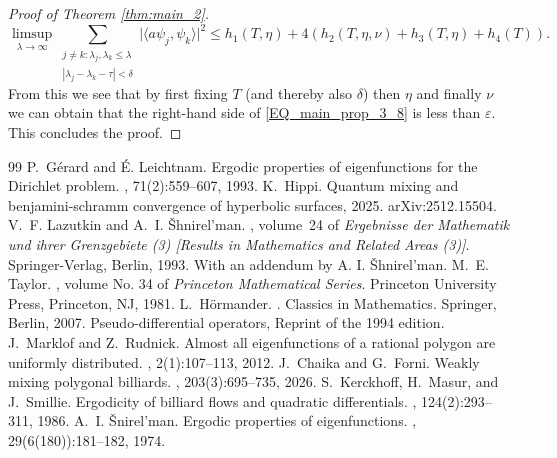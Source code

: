 \documentclass[10pt,a4paper]{amsart}
\newcommand{\1}{\mathrm{\mathbf{1}}}
\numberwithin{equation}{section}
\begin{document}
\begin{proof}[Proof of Theorem \ref{thm:main_2}]
\begin{equation}\label{EQ_main_prop_3_8}
    \limsup_{\lambda\rightarrow\infty}  \sum_{\substack{j\neq k: \lambda_j,\lambda_k\leq \lambda  \\ |\lambda_{j}-\lambda_{k}-\tau| < \delta}} \big| \langle a \psi_j , \psi_k\rangle  \big|^2 
    \leq h_1(T,\eta) + 4( h_{2}(T,\eta,\nu) +  h_3(T,\eta) +  h_4(T)).
\end{equation}
From this we see that by first fixing $T$ (and thereby also $\delta$) then $\eta$ and finally $\nu$ we can obtain that the right-hand side of \eqref{EQ_main_prop_3_8} is less than $\varepsilon$. This concludes the proof.
\end{proof}


\begin{thebibliography}{99}
 P.~G\'erard and \'E. Leichtnam. \newblock Ergodic properties of eigenfunctions for the {D}irichlet problem. , 71(2):559--607, 1993.
 K.~Hippi. \newblock Quantum mixing and benjamini-schramm convergence of hyperbolic surfaces, 2025. \newblock arXiv:2512.15504.
 V.~F. Lazutkin and A.~I. {\v{S}}hnirel'man. , volume~24 of {\em Ergebnisse der Mathematik und ihrer Grenzgebiete (3) [Results in Mathematics and Related Areas (3)]}. \newblock Springer-Verlag, Berlin, 1993. \newblock With an addendum by A. I. {\v{S}}hnirel'man.
 M.~E. Taylor. , volume No. 34 of {\em Princeton Mathematical Series}. \newblock Princeton University Press, Princeton, NJ, 1981.
 L.~H\"ormander. . \newblock Classics in Mathematics. Springer, Berlin, 2007. \newblock Pseudo-differential operators, Reprint of the 1994 edition.
 J.~Marklof and Z.~Rudnick. \newblock Almost all eigenfunctions of a rational polygon are uniformly distributed. , 2(1):107--113, 2012.
 J.~Chaika and G.~Forni. \newblock Weakly mixing polygonal billiards. , 203(3):695--735, 2026.
 S.~Kerckhoff, H.~Masur, and J.~Smillie. \newblock Ergodicity of billiard flows and quadratic differentials. , 124(2):293--311, 1986.
 A.~I. \v{S}nirel'man. \newblock Ergodic properties of eigenfunctions. , 29(6(180)):181--182, 1974.

\end{thebibliography}
\end{document}
